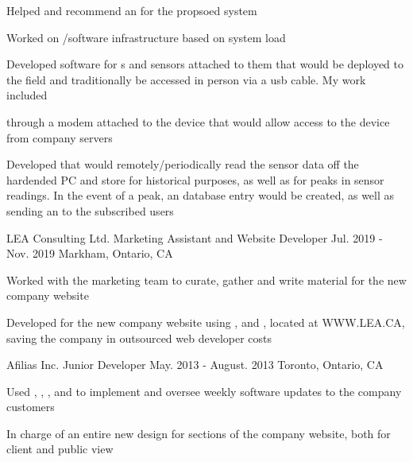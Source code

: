 \begin{cventries}
{\begin{cvitems}
        \begin{cvsubitems}
          \item {Helped  and recommend an  for the propsoed system}
          \item {Worked on /software infrastructure based on system load}
        \end{cvsubitems}
      \item {Developed software for s and sensors attached to them that would be deployed to the field and traditionally be accessed in person via a usb cable. My work included}
        \begin{cvsubitems}
          \item { through a modem attached to the device that would allow  access to the device from company servers}
          \item {Developed  that would remotely/periodically read the sensor data off the hardended PC and store for historical purposes,
           as well as  for peaks in sensor readings. In the event of a peak, an  database entry would be created, as well as sending an  to the subscribed users}
        \end{cvsubitems}
    \end{cvitems}
  }
\cventry
{LEA Consulting Ltd.} %
{Marketing Assistant and Website Developer} %
{Jul. 2019 - Nov. 2019} %
{Markham, Ontario, CA} %
{
  \begin{cvitems} %
    \item {Worked with the marketing team to curate, gather and write material for the new company website}
    \item {Developed  for the new company website using ,  and , located at WWW.LEA.CA, saving the company  in outsourced web developer costs}
  \end{cvitems}
}

\cventry
{Afilias Inc.} %
{Junior Developer} %
{May. 2013 - August. 2013} %
{Toronto, Ontario, CA} %
{
  \begin{cvitems} %
    \item {Used , , ,  and  to implement and oversee weekly software updates to the company customers}
    \item {In charge of an entire new design for sections of the company website, both for client and public view}
  \end{cvitems}
}

\end{cventries}
